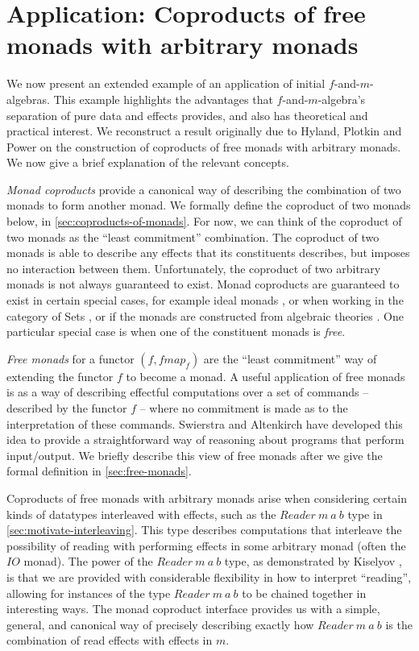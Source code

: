 \documentclass{jfp1}
\begin{document}
\section{Application: Coproducts of free monads with arbitrary monads}
\label{sec:coproducts-with-free-monads}

We now present an extended example of an application of initial
$f$-and-$m$-algebras. This example highlights the advantages that
$f$-and-$m$-algebra's separation of pure data and effects provides,
and also has theoretical and practical interest. We reconstruct a
result originally due to Hyland, Plotkin and Power
\cite{hyland06combining} on the construction of coproducts of free
monads with arbitrary monads. We now give a brief explanation of the
relevant concepts.

\emph{Monad coproducts} provide a canonical way of describing the
combination of two monads to form another monad. We formally define
the coproduct of two monads below, in
\autoref{sec:coproducts-of-monads}. For now, we can think of the
coproduct of two monads as the ``least commitment'' combination. The
coproduct of two monads is able to describe any effects that its
constituents describes, but imposes no interaction between
them. Unfortunately, the coproduct of two arbitrary monads is not
always guaranteed to exist. Monad coproducts are guaranteed to exist
in certain special cases, for example ideal monads
\cite{ghani04coproducts}, or when working in the category of Sets
\cite{adamek12coproducts}, or if the monads are constructed from algebraic
theories \cite{hyland06combining}. One particular special case is when one of the
constituent monads is \emph{free}.

\emph{Free monads} for a functor $(f, \mathit{fmap}_f)$ are the
``least commitment'' way of extending the functor $f$ to become a
monad. A useful application of free monads is as a way of describing
effectful computations over a set of commands -- described by the
functor $f$ -- where no commitment is made as to the interpretation of
these commands. Swierstra and Altenkirch \cite{swierstra07beauty} have
developed this idea to provide a straightforward way of reasoning
about programs that perform input/output. We briefly describe this
view of free monads after we give the formal definition in
\autoref{sec:free-monads}.

Coproducts of free monads with arbitrary monads arise when considering
certain kinds of datatypes interleaved with effects, such as the
$\mathit{Reader}~m~a~b$ type in
\autoref{sec:motivate-interleaving}. This type describes computations
that interleave the possibility of reading with performing effects in
some arbitrary monad (often the $\mathit{IO}$ monad). The power of the
$\mathit{Reader}~m~a~b$ type, as demonstrated by Kiselyov
\cite{kiselyov12iteratees}, is that we are provided with considerable
flexibility in how to interpret ``reading'', allowing for instances of
the type $\mathit{Reader}~m~a~b$ to be chained together in interesting
ways. The monad coproduct interface provides us with a simple,
general, and canonical way of precisely describing exactly how
$\mathit{Reader}~m~a~b$ is the combination of read effects with
effects in $m$.
\end{document}
